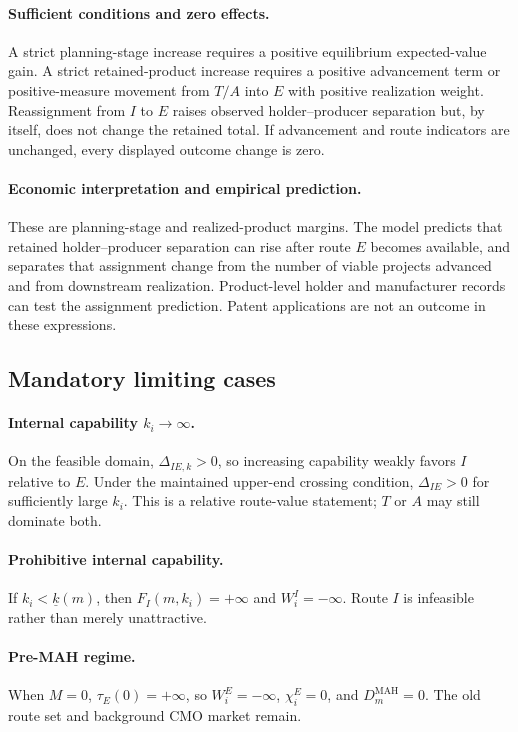 \paragraph{Sufficient conditions and zero effects.}
A strict planning-stage increase requires a positive equilibrium expected-value
gain. A strict retained-product increase requires a positive advancement term
or positive-measure movement from \(T/A\) into \(E\) with positive realization
weight. Reassignment from \(I\) to \(E\) raises observed holder--producer
separation but, by itself, does not change the retained total. If advancement
and route indicators are unchanged, every displayed outcome change is zero.

\paragraph{Economic interpretation and empirical prediction.}
These are planning-stage and realized-product margins. The model predicts that
retained holder--producer separation can rise after route \(E\) becomes
available, and separates that assignment change from the number of viable
projects advanced and from downstream realization. Product-level holder and
manufacturer records can test the assignment prediction. Patent applications
are not an outcome in these expressions.

\subsection{Mandatory limiting cases}
\label{subsec:p15-boundaries}

\paragraph{Internal capability \(k_i\to\infty\).}
On the feasible domain, \(\Delta_{IE,k}>0\), so increasing capability weakly
favors \(I\) relative to \(E\). Under the maintained upper-end crossing
condition, \(\Delta_{IE}>0\) for sufficiently large \(k_i\). This is a relative
route-value statement; \(T\) or \(A\) may still dominate both.

\paragraph{Prohibitive internal capability.}
If \(k_i<\underline{k}(m)\), then \(F_I(m,k_i)=+\infty\) and
\(W_i^I=-\infty\). Route \(I\) is infeasible rather than merely unattractive.

\paragraph{Pre-MAH regime.}
When \(M=0\), \(\tau_E(0)=+\infty\), so \(W_i^E=-\infty\),
\(\chi_i^E=0\), and \(D_m^{\mathrm{MAH}}=0\). The old route set and background
CMO market remain.


